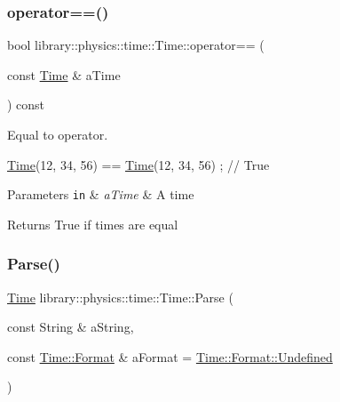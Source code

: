 \subsubsection{\texorpdfstring{operator==()}{operator==()}}
{\footnotesize\ttfamily bool library\+::physics\+::time\+::\+Time\+::operator== (\begin{DoxyParamCaption}\item[{const \hyperlink{classlibrary_1_1physics_1_1time_1_1_time}{Time} \&}]{a\+Time }\end{DoxyParamCaption}) const}



Equal to operator. 


\begin{DoxyCode}
\hyperlink{classlibrary_1_1physics_1_1time_1_1_time_a46a4b9be1451041ae65332f04db21c4b}{Time}(12, 34, 56) == \hyperlink{classlibrary_1_1physics_1_1time_1_1_time_a46a4b9be1451041ae65332f04db21c4b}{Time}(12, 34, 56) ; \textcolor{comment}{// True}
\end{DoxyCode}



\begin{DoxyParams}[1]{Parameters}
\mbox{\tt in}  & {\em a\+Time} & A time \\
\hline
\end{DoxyParams}
\begin{DoxyReturn}{Returns}
True if times are equal 
\end{DoxyReturn}
\mbox{\label{classlibrary_1_1physics_1_1time_1_1_time_a0756ad7ca377adc810b7515411657e3b}} 
\subsubsection{\texorpdfstring{Parse()}{Parse()}}
{\footnotesize\ttfamily \hyperlink{classlibrary_1_1physics_1_1time_1_1_time}{Time} library\+::physics\+::time\+::\+Time\+::\+Parse (\begin{DoxyParamCaption}\item[{const String \&}]{a\+String,  }\item[{const \hyperlink{classlibrary_1_1physics_1_1time_1_1_time_a7cfbcbb1d5d0c536e28e61f1e7cbf1c8}{Time\+::\+Format} \&}]{a\+Format = {\ttfamily \hyperlink{classlibrary_1_1physics_1_1time_1_1_time_a7cfbcbb1d5d0c536e28e61f1e7cbf1c8aec0fc0100c4fc1ce4eea230c3dc10360}{Time\+::\+Format\+::\+Undefined}} }\end{DoxyParamCaption})\hspace{0.3cm}{\ttfamily [static]}}




